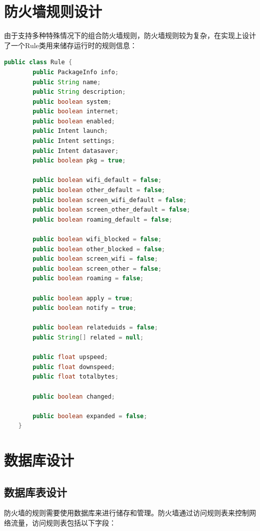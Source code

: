 \documentclass[format=final, language=chinese, degree=bachelor]{hustthesis}
\begin{document}
\section{防火墙规则设计}

由于支持多种特殊情况下的组合防火墙规则，防火墙规则较为复杂，在实现上设计了一个Rule类用来储存运行时的规则信息：

\begin{lstlisting}[language=java]
    public class Rule {
        public PackageInfo info;
        public String name;
        public String description;
        public boolean system;
        public boolean internet;
        public boolean enabled;
        public Intent launch;
        public Intent settings;
        public Intent datasaver;
        public boolean pkg = true;

        public boolean wifi_default = false;
        public boolean other_default = false;
        public boolean screen_wifi_default = false;
        public boolean screen_other_default = false;
        public boolean roaming_default = false;

        public boolean wifi_blocked = false;
        public boolean other_blocked = false;
        public boolean screen_wifi = false;
        public boolean screen_other = false;
        public boolean roaming = false;

        public boolean apply = true;
        public boolean notify = true;

        public boolean relateduids = false;
        public String[] related = null;

        public float upspeed;
        public float downspeed;
        public float totalbytes;

        public boolean changed;

        public boolean expanded = false;
    }
\end{lstlisting}

\section{数据库设计}

\subsection{数据库表设计}
防火墙的规则需要使用数据库来进行储存和管理。防火墙通过访问规则表来控制网络流量，访问规则表包括以下字段：
\end{document}
